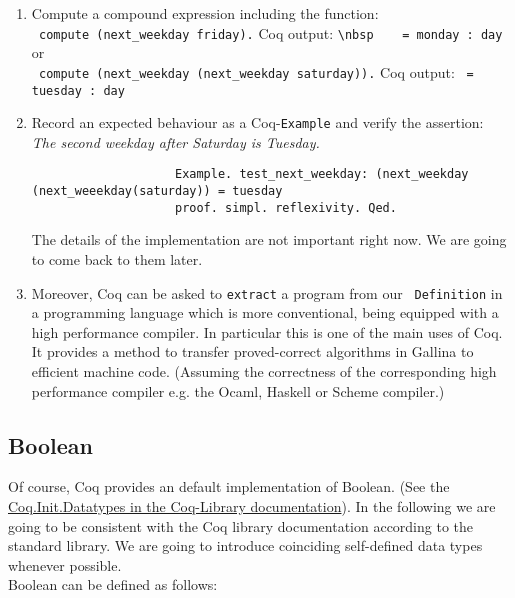 	   \begin{enumerate}
	   \item Compute a compound expression including the function:\\ 		
	 		 \lstinline! compute (next_weekday friday).! Coq output: \lstinline!\nbsp	 = monday : day ! or \\
	 		 \lstinline! compute (next_weekday (next_weekday saturday)).! Coq output: \lstinline! = tuesday : day !\\ 	      
	   \item Record an expected behaviour as a Coq-\lstinline!Example! and verify the assertion:\\ 
	         {\itshape The second weekday after Saturday is Tuesday.}     
			   \begin{lstlisting}
			   		Example. test_next_weekday: (next_weekday (next_weeekday(saturday)) = tuesday 
			   		proof. simpl. reflexivity. Qed.
			   \end{lstlisting}
	   			The details of the implementation are not important right now. 
	   			We are going to come back to them later.
	   
	   \item \label{CoqAsCodeGen} Moreover, Coq can be asked to \lstinline!extract! a program from our \lstinline! Definition! in a programming language which is more conventional, being equipped with a high performance compiler.
	    In particular this is one of the main uses of Coq. 
	    It provides a method to transfer proved-correct algorithms in Gallina to efficient machine code.
	    (Assuming the correctness of the corresponding high performance compiler e.g. the Ocaml, Haskell or Scheme compiler.) 			
	   \end{enumerate}   
	
	\subsection{Boolean}
	
	    Of course, Coq provides an default implementation of Boolean.
	    (See the \newline \href{https://www.cs.princeton.edu/courses/archive/fall07/cos595/stdlib/html/Coq.Init.Datatypes.html}{Coq.Init.Datatypes in the Coq-Library documentation}).  
	    In the following we are going to be consistent with the Coq library documentation according to the standard library.
	    We are going to introduce coinciding self-defined data types whenever possible.\\
	    Boolean can be defined as follows:
	    
